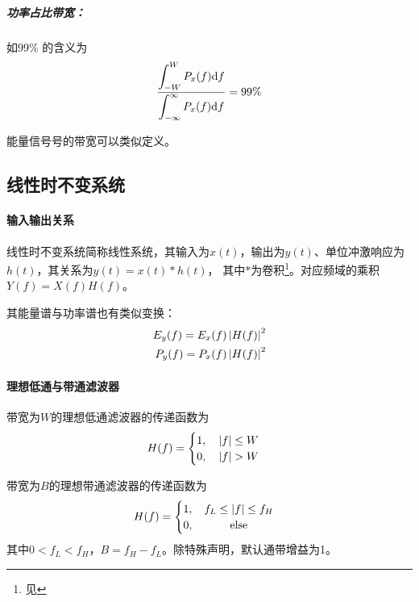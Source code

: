     \subparagraph{\hspace{1em}功率占比带宽：}如99\% 的含义为
    \begin{equation}
        \frac{\displaystyle\int_{-W}^{W}P_x(f)\text{\upshape d} f}{\displaystyle\int_{-\infty}^{\infty}P_x(f)\text{\upshape d} f}=99\%
    \end{equation}

    能量信号号的带宽可以类似定义。

\subsection{线性时不变系统}

    \paragraph{输入输出关系}\mbox{}

    线性时不变系统简称线性系统，其输入为$x(t)$，输出为$y(t)$、单位冲激响应为$h(t)$，其关系为$y(t)=x(t)*h(t)$，
    其中$*$为卷积\footnote{见}。对应频域的乘积$Y(f)=X(f)H(f)$。

    其能量谱与功率谱也有类似变换：
    \begin{align}
        E_y(f)=E_x(f)\left\vert H(f) \right\vert^2\\
        P_y(f)=P_x(f)\left\vert H(f) \right\vert^2
    \end{align}

    \paragraph{理想低通与带通滤波器}\mbox{}

    带宽为$W$的理想低通滤波器的传递函数为
    \begin{equation}
        H(f)=
        \begin{cases}
            1,\hspace{1em}\left\vert f \right\vert\leq W\\
            0,\hspace{1em}\left\vert f \right\vert> W
        \end{cases}
    \end{equation}
    
    带宽为$B$的理想带通滤波器的传递函数为
    \begin{equation}
        H(f)=
        \begin{cases}
            1,\hspace{1em}\mathmakebox[6em][c]{f_L\leq\abs{f}\leq f_H} \\
            0,\hspace{1em}\mathmakebox[6em][c]{\text{else}}
        \end{cases}
    \end{equation}
    其中$0<f_L<f_H$，$B=f_H-f_L$。除特殊声明，默认通带增益为1。

